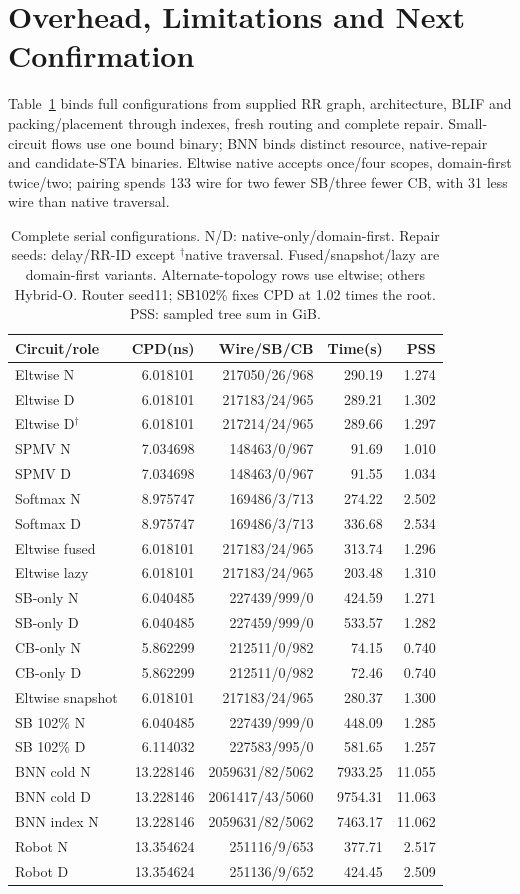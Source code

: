 \documentclass[conference,10pt]{IEEEtran}
\begin{document}
\section{Overhead, Limitations and Next Confirmation}
Table~\ref{tab:completecost} binds full configurations from supplied RR graph, architecture, BLIF and packing/placement through indexes, fresh routing and complete repair. Small-circuit flows use one bound binary; BNN binds distinct resource, native-repair and candidate-STA binaries. Eltwise native accepts once/four scopes, domain-first twice/two; pairing spends 133 wire for two fewer SB/three fewer CB, with 31 less wire than native traversal.
\begin{table}[t]
\centering\footnotesize\setlength{\tabcolsep}{3pt}
\caption{Complete serial configurations. N/D: native-only/domain-first. Repair seeds: delay/RR-ID except $^\dagger$native traversal. Fused/snapshot/lazy are domain-first variants. Alternate-topology rows use eltwise; others Hybrid-O. Router seed11; SB102\% fixes CPD at 1.02 times the root. PSS: sampled tree sum in GiB.}
\label{tab:completecost}
\begin{tabular}{lrrrr}\hline
Circuit/role & CPD(ns) & Wire/SB/CB & Time(s) & PSS\\\hline
Eltwise N&6.018101&217050/26/968&290.19&1.274\\
Eltwise D&6.018101&217183/24/965&289.21&1.302\\
Eltwise D$^\dagger$&6.018101&217214/24/965&289.66&1.297\\
SPMV N&7.034698&148463/0/967&91.69&1.010\\
SPMV D&7.034698&148463/0/967&91.55&1.034\\
Softmax N&8.975747&169486/3/713&274.22&2.502\\
Softmax D&8.975747&169486/3/713&336.68&2.534\\
Eltwise fused&6.018101&217183/24/965&313.74&1.296\\
Eltwise lazy&6.018101&217183/24/965&203.48&1.310\\
SB-only N&6.040485&227439/999/0&424.59&1.271\\
SB-only D&6.040485&227459/999/0&533.57&1.282\\
CB-only N&5.862299&212511/0/982&74.15&0.740\\
CB-only D&5.862299&212511/0/982&72.46&0.740\\
Eltwise snapshot&6.018101&217183/24/965&280.37&1.300\\
SB 102\% N&6.040485&227439/999/0&448.09&1.285\\
SB 102\% D&6.114032&227583/995/0&581.65&1.257\\
BNN cold N&13.228146&2059631/82/5062&7933.25&11.055\\
BNN cold D&13.228146&2061417/43/5060&9754.31&11.063\\
BNN index N&13.228146&2059631/82/5062&7463.17&11.062\\
Robot N&13.354624&251116/9/653&377.71&2.517\\
Robot D&13.354624&251136/9/652&424.45&2.509\\\hline
\end{tabular}
\end{table}
\end{document}
